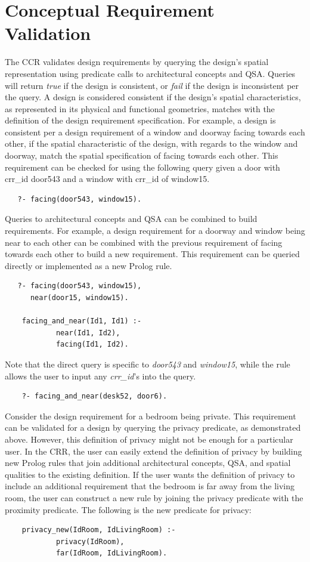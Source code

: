 \documentclass[12pt]{ucthesis}
\begin{document}
\section{Conceptual Requirement Validation}
The CCR validates design requirements by querying the design's spatial representation using predicate calls to architectural concepts and QSA. Queries will return \emph{true} if the design is consistent, or \emph{fail} if the design is inconsistent per the query. A design is considered consistent if the design's spatial characteristics, as represented in its physical and functional geometries, matches with the definition of the design requirement specification. For example, a design is consistent per a design requirement of a window and doorway facing towards each other, if the spatial characteristic of the design, with regards to the window and doorway, match the spatial specification of facing towards each other. This requirement can be checked for using the following query given a door with crr\_id door543 and a window with crr\_id of window15.
\begin{verbatim}
   ?- facing(door543, window15).
\end{verbatim}
Queries to architectural concepts and QSA can be combined to build requirements. For example, a design requirement for a doorway and window being near to each other can be combined with the previous requirement of facing towards each other to build a new requirement. This requirement can be queried directly or implemented as a new Prolog rule. 
\begin{verbatim}
   ?- facing(door543, window15),
      near(door15, window15).
      
    facing_and_near(Id1, Id1) :-
            near(Id1, Id2),
            facing(Id1, Id2).
\end{verbatim}
Note that the direct query is specific to \emph{door543} and \emph{window15}, while the rule allows the user to input any \emph{crr\_id}'s into the query.
\begin{verbatim}
    ?- facing_and_near(desk52, door6).
\end{verbatim}

Consider the design requirement for a bedroom being private. This requirement can be validated for a design by querying the privacy predicate, as demonstrated above. However, this definition of privacy might not be enough for a particular user. In the CRR, the user can easily extend the definition of privacy by building new Prolog rules that join additional architectural concepts, QSA, and spatial qualities to the existing definition. If the user wants the definition of privacy to include an additional requirement that the bedroom is far away from the living room, the user can construct a new rule by joining the privacy predicate with the proximity predicate. The following is the new predicate for privacy:
\begin{verbatim}
    privacy_new(IdRoom, IdLivingRoom) :-
            privacy(IdRoom),
            far(IdRoom, IdLivingRoom).
\end{verbatim}
\end{document}
